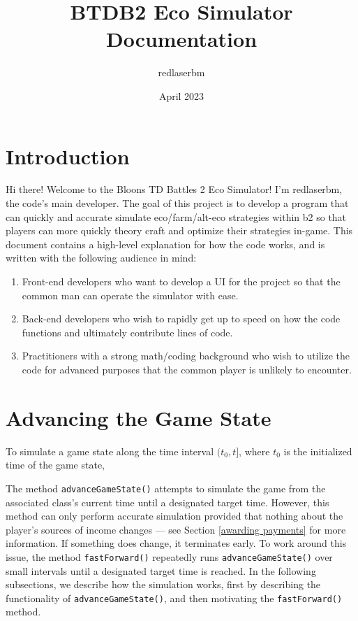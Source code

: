 \documentclass[12pt,letterpaper]{article}
\theoremstyle{remark}
\theoremstyle{plain}
\begin{document}
\title{BTDB2 Eco Simulator Documentation}
\author{redlaserbm}
\date{April 2023}
\maketitle

\section{Introduction}

Hi there! Welcome to the Bloons TD Battles 2 Eco Simulator! I'm redlaserbm, the code's main developer. The goal of this project is to develop a program that can quickly and accurate simulate eco/farm/alt-eco strategies within b2 so that players can more quickly theory craft and optimize their strategies in-game. This document contains a high-level explanation for how the code works, and is written with the following audience in mind:
\begin{enumerate}
    \item Front-end developers who want to develop a UI for the project so that the common man can operate the simulator with ease.
    \item Back-end developers who wish to rapidly get up to speed on how the code functions and ultimately contribute lines of code.
    \item Practitioners with a strong math/coding background who wish to utilize the code for advanced purposes that the common player is unlikely to encounter.
\end{enumerate}

\section{Advancing the Game State}\label{advancing the game state}

To simulate a game state along the time interval $(t_0,t]$, where $t_0$ is the initialized time of the game state, 

The method \texttt{advanceGameState()} attempts to simulate the game from the associated class's current time until a designated target time. However, this method can only perform accurate simulation provided that nothing about the player's sources of income changes --- see Section \ref{awarding payments} for more information. If something does change, it terminates early. To work around this issue, the method \texttt{fastForward()} repeatedly runs \texttt{advanceGameState()} over small intervals until a designated target time is reached. In the following subsections, we describe how the simulation works, first by describing the functionality of \texttt{advanceGameState()}, and then motivating the \texttt{fastForward()} method.
\end{document}
